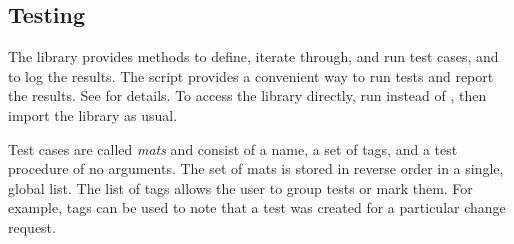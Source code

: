 %
%
%

\subsection {Testing}

The  library provides methods to
define, iterate through, and run test cases, and to log the
results.
The  script provides a convenient way to
run tests and report the results.
See  for details.
To access the  library directly, run
 instead of ,
then import the library as usual.

Test cases are called \emph{mats} and consist of a name, a
set of tags, and a test procedure of no arguments.
The set of mats is stored in
reverse order in a single, global list.
The list of tags allows the
user to group tests or mark them.  For example, tags can be used to
note that a test was created for a particular change request.

\label{sec:mat}
\begin{syntax}
\end{syntax}
\expandsto{} 


